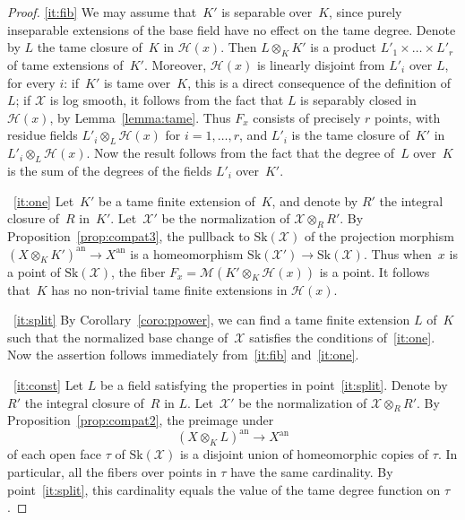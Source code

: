 \documentclass[11pt]{article}
\newcommand{\skpt}{\smallskip}
\let\mathcal\mathscr
\theoremstyle{definition}
\numberwithin{equation}{subsection}
\newcommand{\cX}{\ensuremath{\mathscr{X}}}
\newcommand{\an}{\mathrm{an}}
\newcommand{\Sk}{\mathrm{Sk}}
\newcommand{\tdeg}{\mathrm{tdeg}}
\begin{document}
\skpt
\begin{proof}
\eqref{it:fib} We may assume that~$K'$ is separable over~$K$, since purely inseparable extensions of the base field have no effect on the tame degree.
Denote by $L$ the tame closure of~$K$ in $\mathscr{H}(x)$. Then $L\otimes_K K'$ is a product $L'_1\times \ldots \times L'_r$ of tame extensions of~$K'$.
Moreover, $\mathscr{H}(x)$ is linearly disjoint from $L'_i$ over $L$, for every $i$: if~$K'$ is tame over~$K$, this is a direct consequence of the definition of $L$; if
$\cX$ is log smooth, it follows from the fact that $L$ is separably closed in $\mathscr{H}(x)$, by Lemma~\ref{lemma:tame}.
Thus $F_x$ consists of precisely $r$ points, with residue fields $L'_i\otimes_L \mathscr{H}(x)$ for $i=1,\ldots,r$, and $L'_i$ is the tame closure of~$K'$ in $L'_i\otimes_L \mathscr{H}(x)$. Now the result follows from the fact that the degree of~$L$ over~$K$ is the sum of the degrees of the fields $L'_i$ over~$K'$.

~\eqref{it:one} Let~$K'$ be a tame finite extension of~$K$, and denote by $R'$ the integral closure of~$R$ in~$K'$. Let~$\cX'$ be the normalization of $\cX\otimes_R R'$.
By Proposition~\ref{prop:compat3}, the pullback to $\Sk(\cX)$ of the projection morphism $(X\otimes_K K')^{\an}\to X^{\an}$ is a homeomorphism
$\Sk(\cX')\to \Sk(\cX)$. Thus when~$x$ is a point of $\Sk(\cX)$, the fiber $F_x=\mathcal{M}(K'\otimes_K \mathscr{H}(x))$ is a point.
It follows that~$K$ has no non-trivial tame finite extensions in $\mathscr{H}(x)$.

~\eqref{it:split}
By Corollary~\ref{coro:ppower}, we can find a tame finite extension $L$ of~$K$ such that the normalized base change of~$\cX$ satisfies the conditions of~\eqref{it:one}. Now the assertion
follows immediately from~\eqref{it:fib} and~\eqref{it:one}.

~\eqref{it:const} Let $L$ be a field satisfying the properties in point~\eqref{it:split}.
Denote by $R'$ the integral closure of~$R$ in $L$. Let~$\cX'$ be the normalization of $\cX\otimes_R R'$. By Proposition~\ref{prop:compat2}, the preimage under
\[
(X\otimes_K L)^{\an}\to X^{\an}
\]
of each open face $\tau$ of $\Sk(\cX)$ is a disjoint union of homeomorphic copies of $\tau$. In particular, all the fibers over points in $\tau$ have the same cardinality. By point~\eqref{it:split}, this cardinality equals the value of the tame degree function on $\tau$.
\end{proof}
\end{document}
